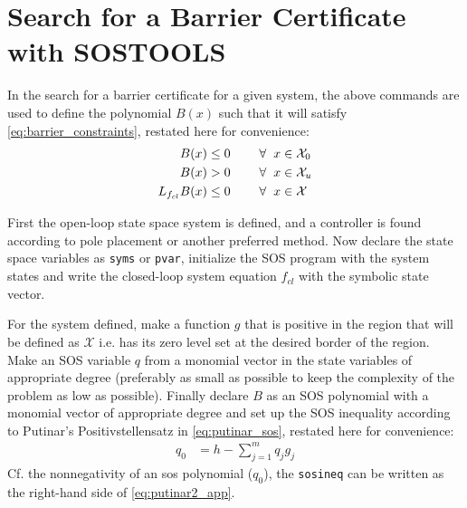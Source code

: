 \section{Search for a Barrier Certificate with SOSTOOLS}\label{sec:app_sostools_barrier_search}
In the search for a barrier certificate for a given system, the above commands are used to define the polynomial $B(x)$ such that it will satisfy \autoref{eq:barrier_constraints}, restated here for convenience:
\begin{subequations}\label{eq:barrier_constraints_app}
	\begin{flalign}
		B(x) &\leq 0 \hspace{0.8cm}  \forall \hspace{2mm} x \in \mathcal{X}_0  \label{cer1_app}\\
		B(x) &> 0  \hspace{0.8cm}  \forall \hspace{2mm} x \in \mathcal{X}_u \label{cer2_app} \\
		L_{f_{cl}}B(x) &\leq 0 \hspace{0.8cm}  \forall \hspace{2mm} x \in \mathcal{X} \label{cer3_app}
	\end{flalign}
\end{subequations}

First the open-loop state space system is defined, and a controller is found according to pole placement or another preferred method. Now declare the state space variables as \verb|syms| or \verb|pvar|, initialize the SOS program with the system states and write the closed-loop system equation $f_{cl}$ with the symbolic state vector.

For the system defined, make a function $g$ that is positive in the region that will be defined as $\mathcal{X}$ i.e. has its zero level set at the desired border of the region. Make an SOS variable $q$ from a monomial vector in the state variables of appropriate degree (preferably as small as possible to keep the complexity of the problem as low as possible). Finally declare $B$ as an SOS polynomial with a monomial vector of appropriate degree and set up the SOS inequality according to Putinar's Positivstellensatz in \autoref{eq:putinar_sos}, restated here for convenience:
\begin{align}
q_0 &= h - \sum _{j=1}^{m}q_jg_j \label{eq:putinar2_app}
\end{align}
Cf. the nonnegativity of an \gls{sos} polynomial ($q_0$), the \verb|sosineq| can be written as the right-hand side of \autoref{eq:putinar2_app}. 

